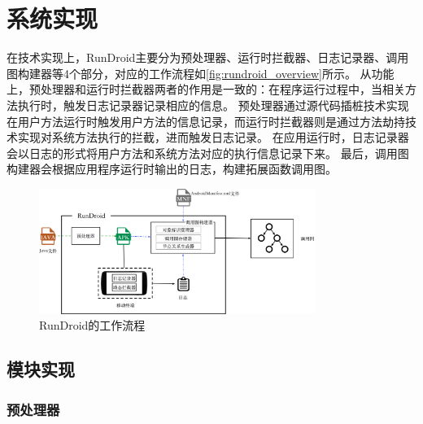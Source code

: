 
\chapter{系统实现 }

\label{chp:implement}




在技术实现上，RunDroid主要分为预处理器、运行时拦截器、日志记录器、调用图构建器等4个部分，对应的工作流程如\autoref{fig:rundroid_overview}所示。
从功能上，预处理器和运行时拦截器两者的作用是一致的：在程序运行过程中，当相关方法执行时，触发日志记录器记录相应的信息。
预处理器通过源代码插桩技术实现在用户方法运行时触发用户方法的信息记录，而运行时拦截器则是通过方法劫持技术实现对系统方法执行的拦截，进而触发日志记录。
在应用运行时，日志记录器会以日志的形式将用户方法和系统方法对应的执行信息记录下来。
最后，调用图构建器会根据应用程序运行时输出的日志，构建拓展函数调用图。

\begin{figure}[!hb]
	\centering
	\includegraphics[width=0.8\textwidth]{./Figures/rundroid-overview.png}
	\caption{ RunDroid的工作流程}
	\label{fig:rundroid_overview}
\end{figure}


\section{模块实现}



\subsection{预处理器}

